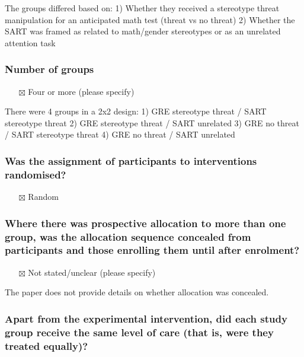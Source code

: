\documentclass[
  doc, a4paper]{apa7}
\providecommand{\tightlist}{%
  \setlength{\itemsep}{0pt}\setlength{\parskip}{0pt}}
\begin{document}
The groups differed based on:
1) Whether they received a stereotype threat manipulation for an anticipated math test (threat vs no threat)
2) Whether the SART was framed as related to math/gender stereotypes or as an unrelated attention task

\subsubsection{Number of groups}\label{number-of-groups}

\begin{itemize}
\tightlist
\item[$\boxtimes$]
  Four or more (please specify)
\end{itemize}

There were 4 groups in a 2x2 design:
1) GRE stereotype threat / SART stereotype threat
2) GRE stereotype threat / SART unrelated
3) GRE no threat / SART stereotype threat
4) GRE no threat / SART unrelated

\subsubsection{Was the assignment of participants to interventions randomised?}\label{was-the-assignment-of-participants-to-interventions-randomised}

\begin{itemize}
\tightlist
\item[$\boxtimes$]
  Random
\end{itemize}

\subsubsection{Where there was prospective allocation to more than one group, was the allocation sequence concealed from participants and those enrolling them until after enrolment?}\label{where-there-was-prospective-allocation-to-more-than-one-group-was-the-allocation-sequence-concealed-from-participants-and-those-enrolling-them-until-after-enrolment}

\begin{itemize}
\tightlist
\item[$\boxtimes$]
  Not stated/unclear (please specify)
\end{itemize}

The paper does not provide details on whether allocation was concealed.

\subsubsection{Apart from the experimental intervention, did each study group receive the same level of care (that is, were they treated equally)?}\label{apart-from-the-experimental-intervention-did-each-study-group-receive-the-same-level-of-care-that-is-were-they-treated-equally}
\end{document}
